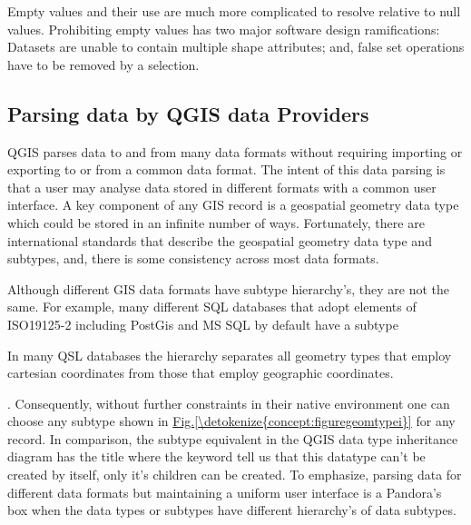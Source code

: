 \documentclass[letterpaper,10pt,english]{sphinxmanual}
\begin{document}
Empty values and their use are much more complicated to resolve relative to null values.  Prohibiting empty values has
two major software design ramifications: Datasets are unable to contain multiple shape attributes; and, false set operations have to be removed by a selection.


\subsection{Parsing data by QGIS data Providers}
\label{\detokenize{concept:parsing-data-by-qgis-data-providers}}
QGIS parses data to and from many data formats without requiring importing or exporting to or from a common data format.  The intent of this data parsing is that a user may analyse data stored in different formats with a common user interface.  A key component of any GIS record is a geospatial geometry data type which could be stored in an infinite number of ways.  Fortunately, there are international standards  that describe the geospatial geometry data type and subtypes, and, there is some consistency across most data formats.

Although different GIS data formats have  subtype hierarchy’s, they are not the same.  For example, many different SQL databases that adopt elements of ISO19125-2  including PostGis and MS SQL by default have a  subtype %
\begin{footnote}[4]\sphinxAtStartFootnote
In many QSL databases the hierarchy separates all geometry types that employ cartesian coordinates from those that employ geographic coordinates.
%
\end{footnote}. Consequently, without further constraints in their native environment one can choose any subtype shown in \hyperref[\detokenize{concept:figuregeomtypei}]{Fig.\@ \ref{\detokenize{concept:figuregeomtypei}}} for any record.  In comparison, the  subtype equivalent in the QGIS data type inheritance diagram  has the title  where the  keyword tell us that this datatype can’t be created by itself, only it’s children can be created.  To emphasize, parsing data for different data formats but maintaining a uniform user interface is a Pandora’s box when the data types or subtypes have different hierarchy’s of data subtypes.
\end{document}
